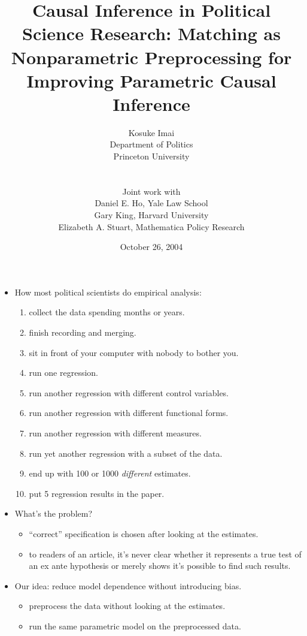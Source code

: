 \documentclass[20pt,landscape,pdftex]{foils}
\title{Causal Inference in Political Science Research: Matching as
  Nonparametric Preprocessing for Improving Parametric Causal
  Inference}
\date{October 26, 2004}
\author{  Kosuke Imai\\
  Department of Politics\\ Princeton University \\
  \\ \\
  Joint work with \\
  Daniel E. Ho, Yale Law School\\
  Gary King, Harvard University\\
  Elizabeth A. Stuart, Mathematica Policy Research
\mbox{}\pdfbookmark{TitlePage}{stlab0}}
\begin{document}
\color{black}
\LOGOOFF
\maketitle



\hypersetup{pdfpagetransition=Replace}

\begin{itemize}
\item How most political scientists do empirical analysis:\pause
  \begin{enumerate}
  \item collect the data spending months or years.\pause
  \item finish recording and merging.\pause
  \item sit in front of your computer with nobody to bother you.\pause
  \item run one regression.\pause
  \item run another regression with different control variables.\pause
  \item run another regression with different functional forms.\pause
  \item run another regression with different measures.\pause
  \item run yet another regression with a subset of the data.\pause
  \item end up with 100 or 1000 {\it different} estimates.\pause
  \item put 5 regression results in the paper.\pause 
  \end{enumerate}
\item What's the problem?\pause
  \begin{itemize}
  \item ``correct'' specification is chosen after looking at the
    estimates.\pause  
  \item to readers of an article, it's never clear whether it
    represents a true test of an ex ante hypothesis or merely shows
    it's possible to find such results.\pause
  \end{itemize}

\item Our idea: reduce model dependence without introducing
  bias.\pause
  \begin{itemize}
  \item preprocess the data without looking at the estimates.\pause
  \item run the same parametric model on the preprocessed data.\pause
  \end{itemize} 
\end{itemize}
\end{document}
